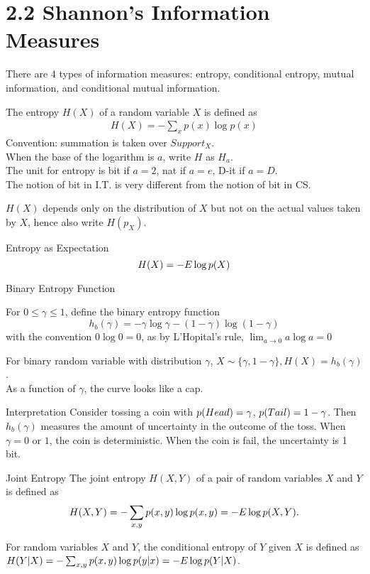 \documentclass[../main.tex]{subfiles}
\begin{document}
\section{2.2 Shannon's Information Measures}
There are 4 types of information measures: entropy, conditional entropy, mutual information, and conditional mutual information.
\begin{definition}
    The entropy $H(X)$ of a random variable $X$
 is defined as \begin{align}
     H(X) = - \sum_x p(x) \log p(x)
 \end{align}
 Convention: summation is taken over $Support_X$.\\
 When the base of the logarithm is $a$, write $H$ as $H_a$.\\
 The unit for entropy is bit if $a = 2$, nat if $a=e$, D-it if $a=D$.\\
 The notion of bit in I.T. is very different from the notion of bit in CS.
 \end{definition}
\begin{remark}
    $H(X)$ depends only on the distribution of $X$ but not on the actual values taken by $X$, hence also write $H(p_X)$.
\end{remark}
Entropy as Expectation
\begin{equation*}
    H(X) = -E \log p(X)
\end{equation*}
\begin{gbox}{Binary Entropy Function}
    \begin{definition}
        For $0 \leq \gamma\leq 1$, define the binary entropy function \begin{equation*}
            h_b(\gamma) = -\gamma \log \gamma - (1-\gamma) \log (1-\gamma)
        \end{equation*} with the convention $0 \log 0 = 0$, as by L'Hopital's rule, $\lim_{a\to 0}a\log a=0$
    \end{definition}
\end{gbox}
For binary random variable with distribution $\gamma$, $X\sim \{\gamma, 1-\gamma\}, H(X) = h_b(\gamma)$.\\
As a function of $\gamma$, the curve looks like a cap.
\begin{pbox}{Interpretation}
    Consider tossing a coin with $p(Head) = \gamma$, $p(Tail) = 1-\gamma$. Then $h_b(\gamma)$ measures the amount of uncertainty in the outcome of the toss. When $\gamma =0$ or $1$, the coin is deterministic. When the coin is fail, the uncertainty is 1 bit.
\end{pbox}
\begin{gbox}{Joint Entropy}
    The joint entropy $H(X,Y)$ of a pair of random variables $X$ and $Y$ is defined as \begin{equation*}
        H(X,Y) = -\sum_{x,y}p(x,y)\log p(x,y) = -E \log p(X,Y).
    \end{equation*}
\end{gbox}
\begin{gbox}{}
    For random variables $X$ and $Y$, the conditional entropy of $Y$ given $X$ is defined as $H(Y|X)=-\sum_{x,y}p(x,y)\log p(y|x) = -E\log p(Y|X)$.
\end{gbox}
\end{document}

